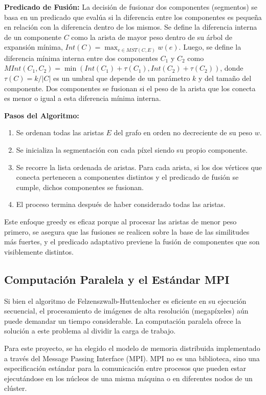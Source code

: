 \documentclass[fleqn,10pt]{article}
\begin{document}
\textbf{Predicado de Fusión:} La decisión de fusionar dos componentes (segmentos) se basa en un predicado que evalúa si la diferencia entre los componentes es pequeña en relación con la diferencia dentro de los mismos. Se define la diferencia interna de un componente $C$ como la arista de mayor peso dentro de su árbol de expansión mínima, $Int(C)=\max_{e \in MST(C,E)} w(e)$. Luego, se define la diferencia mínima interna entre dos componentes $C_1$ y $C_2$ como $MInt(C_1, C_2) = \min(Int(C_1)+\tau(C_1), Int(C_2)+\tau(C_2))$, donde $\tau(C)=k/|C|$ es un umbral que depende de un parámetro $k$ y del tamaño del componente. Dos componentes se fusionan si el peso de la arista que los conecta es menor o igual a esta diferencia mínima interna.

\textbf{Pasos del Algoritmo:}
\begin{enumerate}
    \item Se ordenan todas las aristas $E$ del grafo en orden no decreciente de su peso $w$.
    \item Se inicializa la segmentación con cada píxel siendo su propio componente.
    \item Se recorre la lista ordenada de aristas. Para cada arista, si los dos vértices que conecta pertenecen a componentes distintos y el predicado de fusión se cumple, dichos componentes se fusionan.
    \item El proceso termina después de haber considerado todas las aristas.
\end{enumerate}

Este enfoque greedy es eficaz porque al procesar las aristas de menor peso primero, se asegura que las fusiones se realicen sobre la base de las similitudes más fuertes, y el predicado adaptativo previene la fusión de componentes que son visiblemente distintos.

\subsection{Computación Paralela y el Estándar MPI}
Si bien el algoritmo de Felzenszwalb-Huttenlocher es eficiente en su ejecución secuencial, el procesamiento de imágenes de alta resolución (megapíxeles) aún puede demandar un tiempo considerable. La computación paralela ofrece la solución a este problema al dividir la carga de trabajo.

Para este proyecto, se ha elegido el modelo de memoria distribuida implementado a través del Message Passing Interface (MPI). MPI no es una biblioteca, sino una especificación estándar para la comunicación entre procesos que pueden estar ejecutándose en los núcleos de una misma máquina o en diferentes nodos de un clúster.
\end{document}
